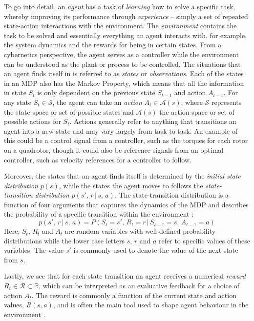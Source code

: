 To go into detail, an \textit{agent} has a task of \textit{learning} how to solve a specific task, whereby improving its performance through \textit{experience} -- simply a set of repeated state-action interactions with the environment. 
The \textit{environment} contains the task to be solved and essentially everything an agent interacts with, for example, the system dynamics and the rewards for being in certain states. From a cybernetics perspective, the agent serves as a controller while the environment can be understood as the plant or process to be controlled.
The situations that an agent finds itself in is referred to as \textit{states} or \textit{observations}. Each of the states in an MDP also has the Markov Property, which means that all the information in state $S_t$ is only dependent on the previous state $S_{t-1}$ and action $A_{t-1}$. 
For any state $S_t \in \mathcal{S}$, the agent can take an \textit{action} $A_t \in \mathcal{A}(s)$, where $\mathcal{S}$ represents the state-space or set of possible states and $\mathcal{A}(s)$ the action-space or set of possible actions for $S_t$. Actions generally refer to anything that transitions an agent into a new state and may vary largely from task to task. An example of this could be a control signal from a controller, such as the torques for each rotor on a quadrotor, though it could also be reference signals from an optimal controller, such as velocity references for a controller to follow.

Moreover, the states that an agent finds itself is determined by the \textit{initial state distribution} $p(s)$, while the states the agent moves to follows the \textit{state-transition distribution} $p(s',\, r\, |\, s,\, a)$. The state-transition distribution is a function of four arguments that captures the dynamics of the MDP and describes the probability of a specific transition within the environment \cite{suttonAndBartoBook}:
\begin{equation}
    p(s',\, r\, |\, s,\, a) = P(S_t = s',\, R_t = r\, |\, S_{t-1} = s,\, A_{t-1} = a)
\end{equation}
Here, $S_t$, $R_t$ and $A_t$ are random variables with well-defined probability distributions while the lower case letters $s$, $r$ and $a$ refer to specific values of these variables. The value $s'$ is commonly used to denote the value of the next state from $s$.

Lastly, we see that for each state transition an agent receives a numerical \textit{reward} $R_t \in \mathcal{R} \subset \mathbb{R}$, which can be interpreted as an evaluative feedback for a choice of action $A_t$. The reward is commonly a function of the current state and action values, $R(s, a)$, and is often the main tool used to shape agent behaviour in the environment \cite{RLinRoboticsSurvey}. 



